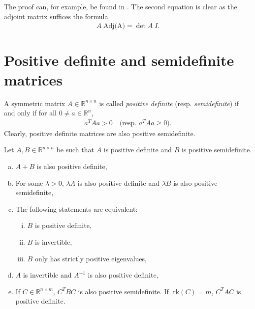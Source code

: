 \documentclass[a4paper,11pt]{report}
\newcommand{\rk}{\;\text{rk}}
\begin{document}
\begin{appendix}
\begin{Bew}
The proof can, for example, be found in \cite{Golberg1972}. The second equation is clear as the adjoint matrix suffices the formula
\begin{align*}
A\;\text{Adj(A)}=\det A\;I.
\end{align*}
\end{Bew}

\section{Positive definite and semidefinite matrices}

\begin{Def}
A symmetric matrix $A\in\mathbb{R}^{n\times n}$ is called \emph{positive definite} (resp. \emph{semidefinite}) if and only if for all $0\ne a\in\mathbb{R}^n$, 
\begin{align*}
a^TAa>0
\quad
\text{(resp. } a^TAa\ge 0\text{)}.
\end{align*}
Clearly, positive definite matrices are also positive semidefinite.
\end{Def}

\begin{Pro}\label{definite-pro}
Let $A,B\in\mathbb{R}^{n\times n}$ be such that $A$ is positive definite and $B$ is positive semidefinite.
\begin{enumerate}[a)]
\item $A+B$ is also positive definite,
\item For some $\lambda>0$, $\lambda A$ is also positive definite and $\lambda B$ is also positive semidefinite,
\item The following statements are equivalent:
\begin{enumerate}[(i)]
\item $B$ is positive definite,
\item $B$ is invertible, 
\item $B$ only has strictly positive eigenvalues,
\end{enumerate}
\item $A$ is invertible and $A^{-1}$ is also positive definite,
\item If $C\in\mathbb{R}^{n\times m}$, $C^TBC$ is also positive semidefinite. If $\rk(C)=m$, $C^TAC$ is positive definite.
\end{enumerate}
\end{Pro}


\end{appendix}
\end{document}
